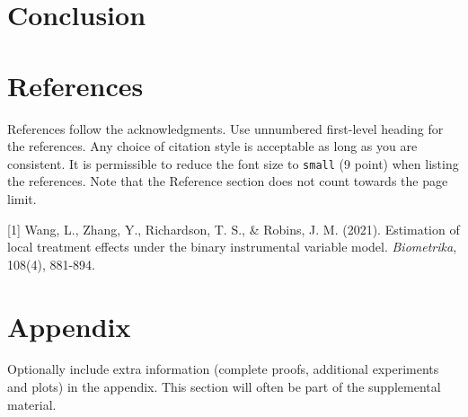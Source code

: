 \documentclass{article}
\begin{document}
\section{Conclusion}
\section*{References}

References follow the acknowledgments. Use unnumbered first-level heading for
the references. Any choice of citation style is acceptable as long as you are
consistent. It is permissible to reduce the font size to \verb+small+ (9 point)
when listing the references.
Note that the Reference section does not count towards the page limit.
\medskip

{
\small

[1] Wang, L., Zhang, Y., Richardson, T. S., \& Robins, J. M. (2021). Estimation of local treatment effects under the binary instrumental variable model. {\it Biometrika}, 108(4), 881-894.
}

\appendix


\section{Appendix}


Optionally include extra information (complete proofs, additional experiments and plots) in the appendix.
This section will often be part of the supplemental material.
\end{document}
